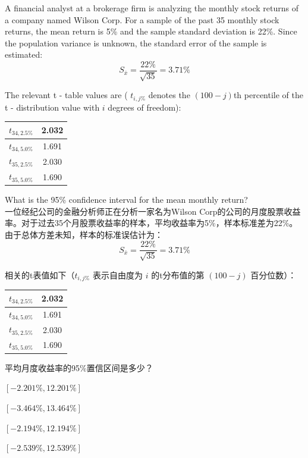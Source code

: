 \documentclass{article}
\newcounter{question} %
\begin{document}
\begin{question}
A financial analyst at a brokerage firm is analyzing the monthly stock returns of a company named Wilson Corp. For a sample of the past 35 monthly stock returns, the mean return is 5\% and the sample standard deviation is 22\%. Since the population variance is unknown, the standard error of the sample is estimated:
\[S_{\bar{x}}=\frac{22\%}{\sqrt{35}}=3.71\%\]

The relevant t - table values are ( \(t_{i,j\%}\) denotes the \((100 - j)\)th percentile of the t - distribution value with \(i\) degrees of freedom):
\begin{center}
\begin{tabular}{|c|c|}
    \hline
    \(t_{34,2.5\%}\) & 2.032\\
    \hline
    \(t_{34,5.0\%}\) & 1.691\\
    \hline
    \(t_{35,2.5\%}\) & 2.030\\
    \hline
    \(t_{35,5.0\%}\) & 1.690\\
    \hline
\end{tabular}
\end{center}
 What is the 95\% confidence interval for the mean monthly return?\\
 一位经纪公司的金融分析师正在分析一家名为Wilson Corp的公司的月度股票收益率。对于过去35个月股票收益率的样本，平均收益率为5\%，样本标准差为22\%。由于总体方差未知，样本的标准误估计为：
\[S_{\bar{x}}=\frac{22\%}{\sqrt{35}}=3.71\%\]

相关的t表值如下（\(t_{i,j\%}\) 表示自由度为 \(i\) 的t分布值的第 \((100 - j)\) 百分位数）：
\begin{center}
\begin{tabular}{|c|c|}
    \hline
    \(t_{34,2.5\%}\) & 2.032\\
    \hline
    \(t_{34,5.0\%}\) & 1.691\\
    \hline
    \(t_{35,2.5\%}\) & 2.030\\
    \hline
    \(t_{35,5.0\%}\) & 1.690\\
    \hline
\end{tabular}
\end{center}
 平均月度收益率的95\%置信区间是多少？\\
\end{question}

\begin{choices}
    \item \([-2.201\%, 12.201\%]\)
    \item \([-3.464\%, 13.464\%]\)
    \item \([-2.194\%, 12.194\%]\)
    \item \([-2.539\%, 12.539\%]\)
\end{choices}
\end{document}
